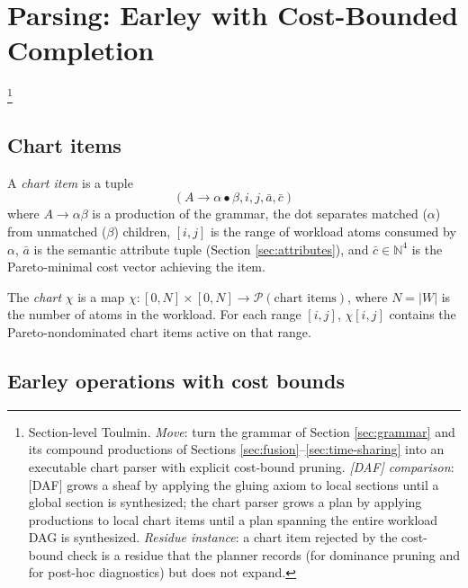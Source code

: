 \section{Parsing: Earley with Cost-Bounded Completion}
\label{sec:parsing}\footnote{Section-level Toulmin. \emph{Move}: turn the grammar of Section \ref{sec:grammar} and its compound productions of Sections \ref{sec:fusion}--\ref{sec:time-sharing} into an executable chart parser with explicit cost-bound pruning. \emph{[DAF] comparison}: [DAF] grows a sheaf by applying the gluing axiom to local sections until a global section is synthesized; the chart parser grows a plan by applying productions to local chart items until a plan spanning the entire workload DAG is synthesized. \emph{Residue instance}: a chart item rejected by the cost-bound check is a residue that the planner records (for dominance pruning and for post-hoc diagnostics) but does not expand.}

\subsection{Chart items}

\begin{definition}\label{def:chart-item}
  A \emph{chart item} is a tuple
  \begin{equation}
    (A \to \alpha \bullet \beta, i, j, \bar{a}, \bar{c})
  \end{equation}
  where $A \to \alpha \beta$ is a production of the
  grammar, the dot separates matched ($\alpha$) from
  unmatched ($\beta$) children, $[i, j]$ is the range
  of workload atoms consumed by $\alpha$, $\bar{a}$
  is the semantic attribute tuple
  (Section \ref{sec:attributes}), and $\bar{c}
  \in \mathbb{N}^4$ is the Pareto-minimal cost
  vector achieving the item.
\end{definition}

\begin{definition}[Chart]\label{def:chart}
  The \emph{chart} $\chi$ is a map
  $\chi : [0, N] \times [0, N] \to \mathcal{P}(
  \text{chart items})$, where $N = |W|$ is the
  number of atoms in the workload. For each range
  $[i, j]$, $\chi[i, j]$ contains the
  Pareto-nondominated chart items active on that
  range.
\end{definition}

\subsection{Earley operations with cost bounds}

